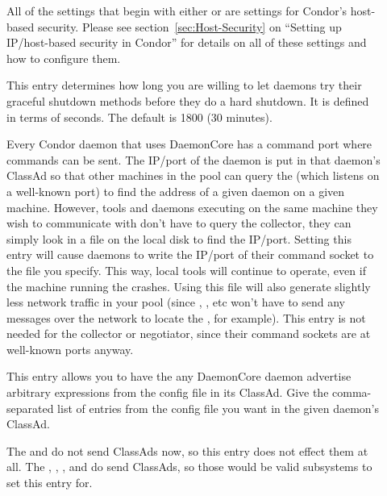 \begin{description}
  
\item[] \label{param:HostAllow} All of the
  settings that begin with either  or
   are settings for Condor's host-based security.
  Please see section~\ref{sec:Host-Security} on ``Setting up
  IP/host-based security in Condor'' for details on all of these
  settings and how to configure them.

\item[]
  \label{param:ShutdownGracefulTimeout} This entry determines how long
  you are willing to let daemons try their graceful shutdown methods
  before they do a hard shutdown.  It is defined in terms of seconds.
  The default is 1800 (30 minutes).

\item[]
  \label{param:SubsysAddressFile} Every Condor daemon that uses
  DaemonCore has a command port where commands can be sent.  The
  IP/port of the daemon is put in that daemon's ClassAd so that other
  machines in the pool can query the  (which listens
  on a well-known port) to find the address of a given daemon on a
  given machine.  However, tools and daemons executing on the same
  machine they wish to communicate with don't have to query the
  collector, they can simply look in a file on the local disk to find
  the IP/port.  Setting this entry will cause daemons to write the
  IP/port of their command socket to the file you specify.  This way,
  local tools will continue to operate, even if the machine running
  the  crashes.  Using this file will also generate
  slightly less network traffic in your pool (since ,
  , etc won't have to send any messages over the network to
  locate the , for example).  This entry is not needed
  for the collector or negotiator, since their command sockets are at
  well-known ports anyway.  
  
\item[] \label{param:SubsysExprs} This entry
  allows you to have the any DaemonCore daemon advertise arbitrary
  expressions from the config file in its ClassAd.  Give the
  comma-separated list of entries from the config file you want in the
  given daemon's ClassAd.
  
  \Note The  and  do not send
  ClassAds now, so this entry does not effect them at all.  The
  , , , and
   do send ClassAds, so those would be valid
  subsystems to set this entry for.
  

\end{description}
